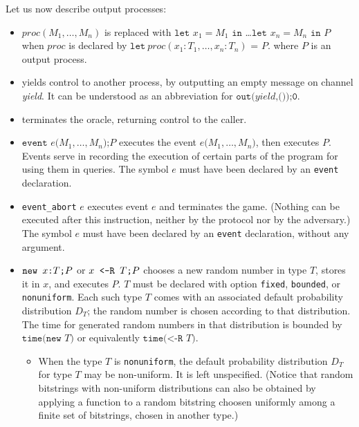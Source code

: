 Let us now describe output processes:
\begin{itemize}

\item $\mathit{proc}(M_1, \dots, M_n)$ is replaced with $\texttt{let}$ $x_1 = M_1$ $\texttt{in}$ \dots $\texttt{let}$ $x_n = M_n$ $\texttt{in}$ $P$ when $\mathit{proc}$ is declared by $\texttt{let}\ \mathit{proc}(x_1:T_1, \dots, x_n:T_n)\texttt{ = }P\texttt{.}$ where $P$ is an output process.

\ifchannels
\item {\yield} yields control to another process, by outputting
an empty message on channel \textit{yield}. It can be understood
as an abbreviation for $\texttt{out(}\textit{yield}\texttt{,());0}$.
\else
\item {\yield} terminates the oracle, returning control to the caller.
\fi

\item $\texttt{event }e\texttt{(}M_1, \ldots, M_n\texttt{);}P$ executes the
event $e\texttt{(}M_1, \ldots, M_n\texttt{)}$, then executes $P$.
Events serve in recording the execution of certain parts of the program
for using them in queries. The symbol $e$ must have been declared
by an \texttt{event} declaration.

\item {\tt event\string_abort} $e$ executes event $e$ and terminates the game. 
(Nothing can be executed after
this instruction, neither by the protocol nor by the adversary.)
The symbol $e$ must have been declared
by an \texttt{event} declaration, without any argument.

\item $\texttt{new\ }{x}\texttt{:}{T}\texttt{;}P$ or ${x}\texttt{ <-R }{T}\texttt{;}P$ chooses a new
random number in type $T$, stores it in $x$, and executes $P$.
$T$ must be declared with option {\tt fixed}, {\tt bounded}, or {\tt nonuniform}.
Each such type $T$ comes with an associated default probability distribution $D_T$;
the random number is chosen according to that distribution.
The time for generated random numbers in that distribution
is bounded by $\texttt{time(new }T\texttt{)}$ or equivalently
$\texttt{time(<-R }T\texttt{)}$.
\begin{itemize}

\item When the type $T$ is {\tt nonuniform}, the default probability 
distribution $D_T$ for type $T$ may be non-uniform. It is left unspecified.
(Notice that random bitstrings with non-uniform distributions can also
be obtained by applying a function to a random bitstring choosen 
uniformly among a finite set of bitstrings, chosen in another type.)


\end{itemize}
\end{itemize}

